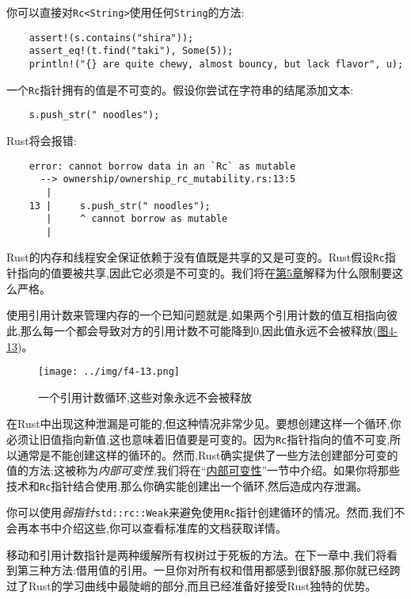 你可以直接对\texttt{Rc<String>}使用任何\texttt{String}的方法:
\begin{verbatim}
    assert!(s.contains("shira"));
    assert_eq!(t.find("taki"), Some(5));
    println!("{} are quite chewy, almost bouncy, but lack flavor", u);
\end{verbatim}

一个\texttt{Rc}指针拥有的值是不可变的。假设你尝试在字符串的结尾添加文本:
\begin{verbatim}
    s.push_str(" noodles");
\end{verbatim}

Rust将会报错:
\begin{verbatim}
    error: cannot borrow data in an `Rc` as mutable
      --> ownership/ownership_rc_mutability.rs:13:5
       |
    13 |     s.push_str(" noodles");
       |     ^ cannot borrow as mutable
       |
\end{verbatim}

Rust的内存和线程安全保证依赖于没有值既是共享的又是可变的。Rust假设\texttt{Rc}指针指向的值要被共享,因此它必须是不可变的。我们将在\hyperref[ch05]{第5章}解释为什么限制要这么严格。

 使用引用计数来管理内存的一个已知问题就是,如果两个引用计数的值互相指向彼此,那么每一个都会导致对方的引用计数不可能降到0,因此值永远不会被释放(\hyperref[f4-13]{图4-13})。

 \begin{figure}[htbp]
    \centering
    \texttt{[image: ../img/f4-13.png]}
    \caption{一个引用计数循环,这些对象永远不会被释放}
    \label{f4-13}
 \end{figure}

在Rust中出现这种泄漏是可能的,但这种情况非常少见。要想创建这样一个循环,你必须让旧值指向新值,这也意味着旧值要是可变的。因为\texttt{Rc}指针指向的值不可变,所以通常是不能创建这样的循环的。然而,Rust确实提供了一些方法创建部分可变的值的方法;这被称为\emph{内部可变性},我们将在“\hyperref[intermut]{内部可变性}”一节中介绍。如果你将那些技术和\texttt{Rc}指针结合使用,那么你确实能创建出一个循环,然后造成内存泄漏。

你可以使用\emph{弱指针}\texttt{std::rc::Weak}来避免使用\texttt{Rc}指针创建循环的情况。然而,我们不会再本书中介绍这些,你可以查看标准库的文档获取详情。

移动和引用计数指针是两种缓解所有权树过于死板的方法。在下一章中,我们将看到第三种方法:借用值的引用。一旦你对所有权和借用都感到很舒服,那你就已经跨过了Rust的学习曲线中最陡峭的部分,而且已经准备好接受Rust独特的优势。
